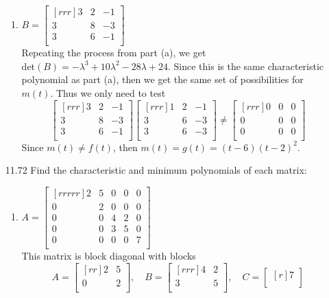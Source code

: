 \documentclass[12pt]{article}
\theoremstyle{definition}
\theoremstyle{plain}
\begin{document}
\begin{enumerate}
\begin{enumerate}
	\item $B=\begin{bmatrix}[rrr]3&2&-1\\3&8&-3\\3&6&-1\\\end{bmatrix}$\\
	Repeating the process from part (a), we get $\mathrm{det}(B)=-\lambda^3+10\lambda^2-28\lambda+24$. Since this is the same characteristic polynomial as part (a), then we get the same set of possibilities for $m(t)$. Thus we only need to test
	\[ \begin{bmatrix}[rrr]3&2&-1\\3&8&-3\\3&6&-1\\\end{bmatrix}\begin{bmatrix}[rrr]1&2&-1\\3&6&-3\\3&6&-3\\\end{bmatrix}\neq\begin{bmatrix}[rrr]0&0&0\\0&0&0\\0&0&0\\\end{bmatrix} \]
	Since $m(t)\neq f(t)$, then $m(t)=g(t)=(t-6)(t-2)^2$.
	\end{enumerate}
\item[11.72]Find the characteristic and minimum polynomials of each matrix:
	\begin{enumerate}
	\item $A=\begin{bmatrix}[rrrrr]2&5&0&0&0\\0&2&0&0&0\\0&0&4&2&0\\0&0&3&5&0\\0&0&0&0&7\\\end{bmatrix}$\\
	This matrix is block diagonal with blocks
	\[ A=\begin{bmatrix}[rr]2&5\\0&2\\\end{bmatrix}, \quad B=\begin{bmatrix}[rrr]4&2\\3&5\\\end{bmatrix}, \quad C=\begin{bmatrix}[r]7\\\end{bmatrix} \]

\end{enumerate}
\end{enumerate}
\end{document}
